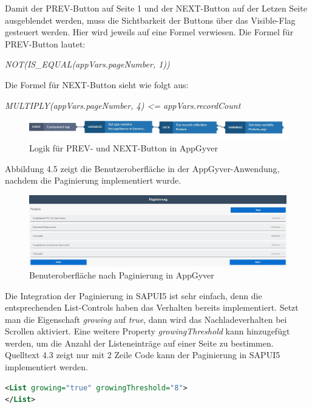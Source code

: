 Damit der PREV-Button auf Seite 1 und der NEXT-Button auf der Letzen Seite ausgeblendet werden, muss die Sichtbarkeit der Buttons über das Visible-Flag gesteuert werden. Hier wird jeweils auf eine Formel verwiesen. Die Formel für PREV-Button lautet:  

\textit{\footnotesize NOT(IS\_EQUAL(appVars.pageNumber, 1))}

Die Formel für NEXT-Button sieht wie folgt aus:

\textit{\footnotesize MULTIPLY(appVars.pageNumber, 4) <= appVars.recordCount}

\begin{figure}[htbp]
 \centering
 \includegraphics[width=1.0\textwidth]{Bilder/appgyver/4_4_Logik_PREV_und_NEXT.jpg}
 \caption{Logik für PREV- und NEXT-Button in AppGyver}
\end{figure}

Abbildung 4.5 zeigt die Benutzeroberfläche in der AppGyver-Anwendung, nachdem die Paginierung implementiert wurde.

\begin{figure}[htbp]
 \centering
 \includegraphics[width=1.0\textwidth]{Bilder/appgyver/4_5_AppGyver_pagnierung.jpg}
 \caption{Benuteroberfläche nach Paginierung in AppGyver }
\end{figure}

Die Integration der Paginierung in SAPUI5 ist sehr einfach, denn die entsprechenden List-Controls haben das Verhalten bereits implementiert. Setzt man die Eigenschaft \textit{growing} auf \textit{true}, dann wird das Nachladeverhalten bei Scrollen aktiviert. Eine weitere Property \textit{growingThreshold} kann hinzugefügt werden, um die Anzahl der Listeneinträge auf einer Seite zu bestimmen. Quelltext 4.3 zeigt nur mit 2 Zeile Code kann der Paginierung in SAPUI5 implementiert werden.
\begin{lstlisting}[language=XML,  caption=Implementation von Paginierung in der \texttt{Main.view.xml}]
<List growing="true" growingThreshold="8">
</List>
\end{lstlisting}

